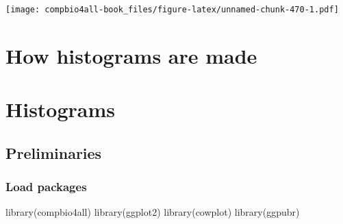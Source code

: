 \documentclass[
]{book}
\newenvironment{Shaded}{\begin{snugshade}}{\end{snugshade}}
\newcommand{\FunctionTok}[1]{\textcolor[rgb]{0.00,0.00,0.00}{#1}}
\newcommand{\NormalTok}[1]{#1}
\begin{document}
\texttt{[image: compbio4all-book\_files/figure-latex/unnamed-chunk-470-1.pdf]}

\hypertarget{how-histograms-are-made}{%
\chapter{How histograms are made}\label{how-histograms-are-made}}

\hypertarget{histograms}{%
\chapter{Histograms}\label{histograms}}

\hypertarget{preliminaries-10}{%
\section{Preliminaries}\label{preliminaries-10}}

\hypertarget{load-packages-1}{%
\subsection{Load packages}\label{load-packages-1}}

\begin{Shaded}
\begin{Highlighting}[]
\FunctionTok{library}\NormalTok{(compbio4all)}
\FunctionTok{library}\NormalTok{(ggplot2)}
\FunctionTok{library}\NormalTok{(cowplot)}
\FunctionTok{library}\NormalTok{(ggpubr)}
\end{Highlighting}
\end{Shaded}
\end{document}
